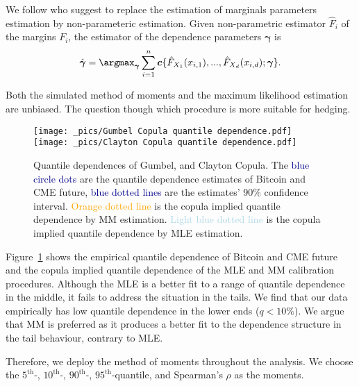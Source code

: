 We follow \citet{genest1995semiparametric} who suggest to replace the estimation of marginals parameters estimation by non-parameteric estimation.
Given non-parametric estimator $\hat{F}_i$ of the margins $F_i$, the estimator of the dependence parameters $\bm{\gamma}$ is
\begin{equation*}
    \hat{\bm{\gamma}} = \argmax_{\bm{\gamma}} \sum_{i=1}^n \bm{c}\{ \hat{F}_{X_1}(x_{i,1}), ..., \hat{F}_{X_d}(x_{i,d});\bm{\gamma}\}.
    \end{equation*}

Both the simulated method of moments and the maximum likelihood estimation are unbiased.
The question though which procedure is more suitable for hedging.

\begin{figure}[h]
\texttt{[image: \_pics/Gumbel Copula quantile dependence.pdf]}
\texttt{[image: \_pics/Clayton Copula quantile dependence.pdf]}
  \caption{Quantile dependences of Gumbel, and Clayton Copula. The \textcolor{darkblue}{blue circle dots} are
  the quantile dependence estimates of Bitcoin and CME future, \textcolor{darkblue}{blue dotted lines} are the estimates' 90\% confidence interval.
  \textcolor{orange}{Orange dotted line} is the copula implied quantile dependence by MM estimation.
  \textcolor{lightblue}{Light blue dotted line} is the copula implied quantile dependence by MLE estimation.
  }
\label{fig:quantile dependence1}
\end{figure}

Figure~\ref{fig:quantile dependence1} shows the empirical quantile dependence of Bitcoin and CME future and the copula implied
quantile dependence of the MLE and MM calibration procedures.
Although the MLE is a better fit to a range of quantile dependence in the middle, it fails to address the situation in the tails.
We find that our data empirically has low quantile dependence in the lower ends ($q<10\%$).
We argue that MM is preferred as it produces a better fit to the dependence
structure in the tail behaviour, contrary to MLE. 

Therefore, we deploy the method of moments throughout the
analysis.
We choose the $5^\text{th}$-, $10^\text{th}$-, $90^\text{th}$-, $95^\text{th}$-quantile, and Spearman's $\rho$ as the moments.


